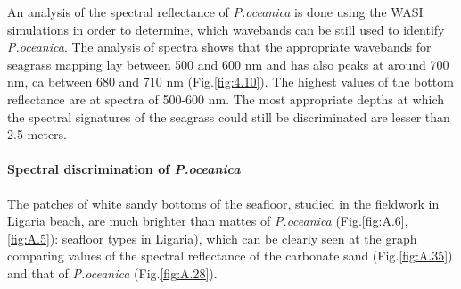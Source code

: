 \documentclass[11pt]{article}
\begin{document}
An analysis of the spectral reflectance of \textit{P.oceanica} is done using the \ac{WASI} simulations in order to determine, which wavebands can be still used to identify \textit{P.oceanica}. The analysis of spectra shows
that the appropriate wavebands for seagrass mapping lay between 500 and 600 nm and has
also peaks at around 700 nm, ca between 680 and 710 nm (Fig.\ref{fig:4.10}). The highest values of the bottom
reflectance are at spectra of 500-600 nm. The most appropriate depths at which the spectral signatures of the seagrass
could still be discriminated are lesser than 2.5 meters.

\paragraph{Spectral discrimination of \textit{P.oceanica}}\label{page-39}
The patches of white sandy bottoms of the seafloor, studied in the fieldwork in Ligaria beach, are
much brighter than mattes of \textit{P.oceanica} (Fig.\ref{fig:A.6}, \ref{fig:A.5}): seafloor types in Ligaria), which can be clearly seen
at the graph comparing values of the spectral reflectance of the carbonate sand (Fig.\ref{fig:A.35}) and that of \textit{P.oceanica} (Fig.\ref{fig:A.28}).
\end{document}
